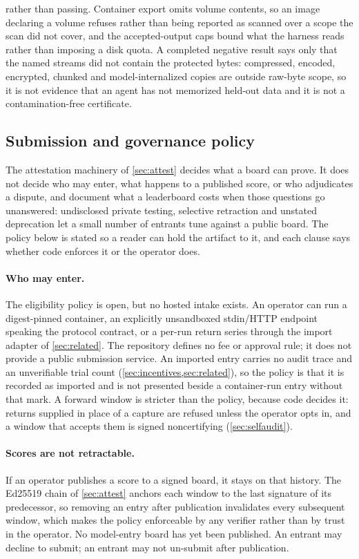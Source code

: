 rather than passing. Container export omits volume contents, so an image declaring a volume refuses rather than being reported as scanned over a scope the scan did not cover, and the accepted-output caps bound what the harness reads rather than imposing a disk quota. A completed negative result says only that the named streams did not contain the protected bytes: compressed, encoded, encrypted, chunked and model-internalized copies are outside raw-byte scope, so it is not evidence that an agent has not memorized held-out data and it is not a contamination-free certificate.

\subsection{Submission and governance policy}\label{sec:governance}

The attestation machinery of \cref{sec:attest} decides what a board can prove. It does not decide who may enter, what happens to a published score, or who adjudicates a dispute, and \citet{leaderboardillusion2025} document what a leaderboard costs when those questions go unanswered: undisclosed private testing, selective retraction and unstated deprecation let a small number of entrants tune against a public board. The policy below is stated so a reader can hold the artifact to it, and each clause says whether code enforces it or the operator does.

\paragraph{Who may enter.} The eligibility policy is open, but no hosted intake exists. An operator can run a digest-pinned container, an explicitly unsandboxed stdin/HTTP endpoint speaking the protocol contract, or a per-run return series through the import adapter of \cref{sec:related}. The repository defines no fee or approval rule; it does not provide a public submission service. An imported entry carries no audit trace and an unverifiable trial count (\cref{sec:incentives,sec:related}), so the policy is that it is recorded as imported and is not presented beside a container-run entry without that mark. A forward window is stricter than the policy, because code decides it: returns supplied in place of a capture are refused unless the operator opts in, and a window that accepts them is signed noncertifying (\cref{sec:selfaudit}).

\paragraph{Scores are not retractable.} If an operator publishes a score to a signed board, it stays on that history. The Ed25519 chain of \cref{sec:attest} anchors each window to the last signature of its predecessor, so removing an entry after publication invalidates every subsequent window, which makes the policy enforceable by any verifier rather than by trust in the operator. No model-entry board has yet been published. An entrant may decline to submit; an entrant may not un-submit after publication.

